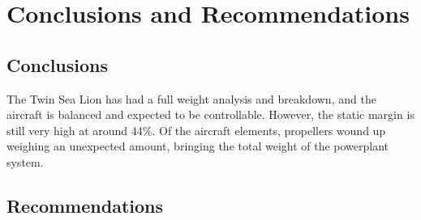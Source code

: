 \documentclass[conf]{new-aiaa}
\begin{document}

\section{Conclusions and Recommendations}
\subsection{Conclusions}
The Twin Sea Lion has had a full weight analysis and breakdown, and the aircraft is balanced and expected to be controllable. However, the static margin is still very high at around 44\%. Of the aircraft elements, propellers wound up weighing an unexpected amount, bringing the total weight of the powerplant system.

\subsection{Recommendations}
\end{document}
